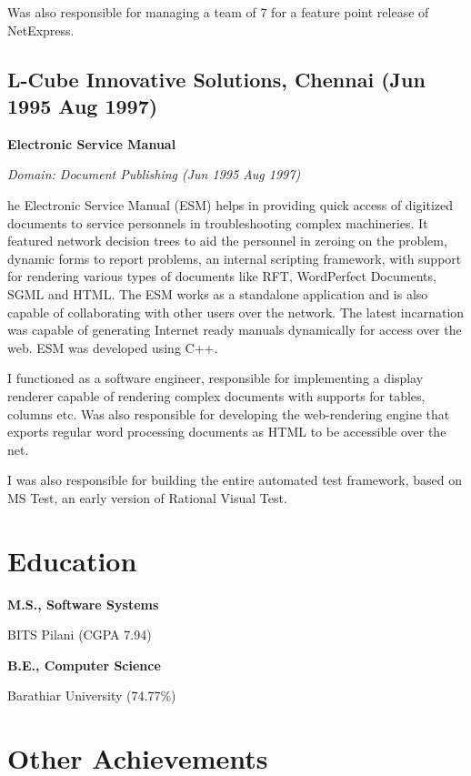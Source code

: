 \documentclass[a4paper,12pt]{article}
\newcommand\cveducation[4]{

  \normalfont\bf{#1, #2}

  \normalfont\small{#3 (#4)}
}
\newcommand\cvsubsection[3]{\subsection*{#1 \quad \small{(#2 \textendash #3)}}}
\newcommand\cvprojectentry[5]{
  \textbf{#1}
  
  \it{Domain: #2}\normalfont{} \quad (#3 \textendash #4)
  
}
\begin{document}
Was also responsible for managing a team of 7 for a feature point
release of NetExpress.

\cvsubsection{L-Cube Innovative Solutions, Chennai}{Jun 1995}{Aug 1997}

\cvprojectentry{Electronic Service Manual}{Document Publishing}{Jun 1995}{Aug 1997}
 
The Electronic Service Manual (ESM) helps in providing quick access of
digitized documents to service personnels in troubleshooting complex
machineries. It featured network decision trees to aid the personnel
in zeroing on the problem, dynamic forms to report problems, an
internal scripting framework, with support for rendering various types
of documents like RFT, WordPerfect Documents, SGML and HTML. The ESM
works as a standalone application and is also capable of collaborating
with other users over the network. The latest incarnation was capable
of generating Internet ready manuals dynamically for access over the
web. ESM was developed using C++.
 
I functioned as a software engineer, responsible for implementing a
display renderer capable of rendering complex documents with supports
for tables, columns etc. Was also responsible for developing the
web-rendering engine that exports regular word processing documents as
HTML to be accessible over the net.
 
I was also responsible for building the entire automated test
framework, based on MS Test, an early version of Rational Visual Test.

\section*{Education}

\cveducation{M.S.}{Software Systems}{BITS Pilani}{CGPA 7.94}
\cveducation{B.E.}{Computer Science}{Barathiar University}{74.77\%}

\section*{Other Achievements}
\end{document}
